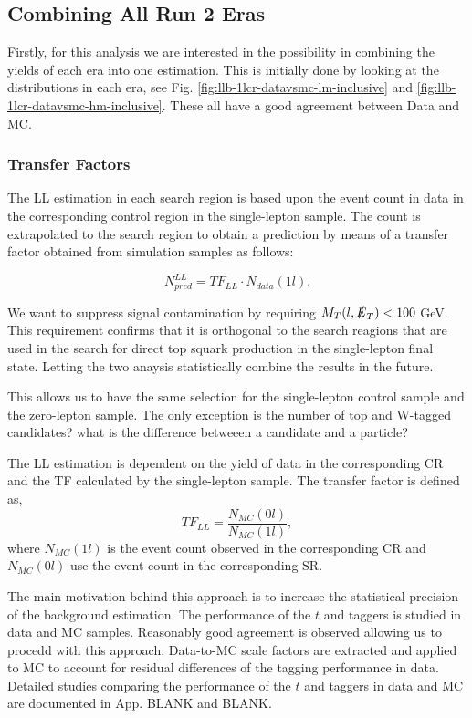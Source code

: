 \subsection{Combining All Run 2 Eras}\label{sec:LLCombination}
Firstly, for this analysis we are interested in the possibility in combining the yields of each era into one estimation. This is initially done by looking at the \met{} distributions in each era, see Fig. \ref{fig:llb-1lcr-datavsmc-lm-inclusive} and \ref{fig:llb-1lcr-datavsmc-hm-inclusive}. These all have a good agreement between Data and MC. 


\subsubsection{Transfer Factors}
\label{subsec:TF}

The LL estimation in each search region is based upon the event count in data in the corresponding control region in the single-lepton sample. The count is extrapolated to the search region to obtain a prediction by means of a transfer factor obtained from simulation samples as follows: 

\begin{equation}
\label{eqn:LLTF}
N_{pred}^{LL}=TF_{LL} \cdot N_{data}(1l).
\end{equation}

We want to suppress signal contamination by requiring $M_{T}(l, \slashed{E}_{T}) < 100$ GeV. This requirement confirms that it is orthogonal to the search reagions that are used in the search for direct top squark production in the single-lepton final state. Letting the two anaysis statistically combine the results in the future. 

This allows us to have the same selection for the single-lepton control sample and the zero-lepton sample. The only exception is the number of top and W-tagged candidates? what is the difference betweeen a candidate and a particle?

The LL estimation is dependent on the yield of data in the corresponding CR and the TF calculated by the single-lepton sample. The transfer factor is defined as, 
\begin{equation}
\label{eqn:TF}
TF_{LL}=\frac{N_{MC}(0l)}{N_{MC}(1l)},
\end{equation}
where $N_{MC}(1l)$ is the event count observed in the corresponding CR and $N_{MC}(0l)$ use the event count in the corresponding SR. 

The main motivation behind this approach is to increase the statistical precision of the background estimation. The performance of the $t$ and \W{} taggers is studied in data and MC samples. Reasonably good agreement is observed allowing us to procedd with this approach. Data-to-MC scale factors are extracted and applied to MC to account for residual differences of the tagging performance in data. Detailed studies comparing the performance of the $t$ and \W{} taggers in data and MC are documented in App. BLANK and BLANK.

